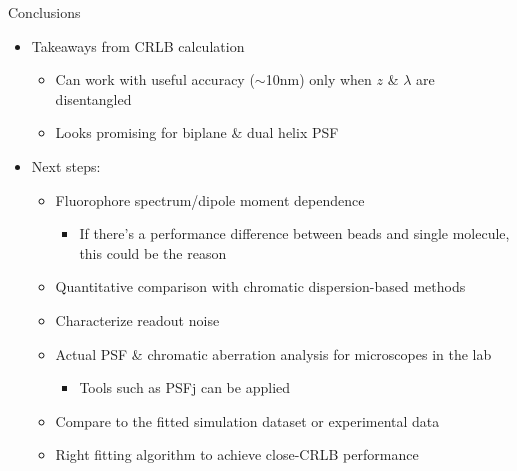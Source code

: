 \documentclass[t]{beamer}
\begin{document}
\begin{frame}{
    Conclusions
}
    \begin{itemize}
        \item Takeaways from CRLB calculation
    \begin{itemize}
        \item Can work with useful accuracy ($\sim$10nm) only when $z$ \& $\lambda$ are disentangled
        \item Looks promising for biplane \& dual helix PSF
    \end{itemize}
        \item Next steps:
    \begin{itemize}
        \item Fluorophore spectrum/dipole moment dependence 
    \begin{itemize}
        \item If there's a performance difference between beads and single molecule, this could be the reason 
    \end{itemize}
            \vspace{0.1em}
        \item Quantitative comparison with chromatic dispersion-based methods
            \vspace{0.1em}
        \item Characterize readout noise
            \vspace{0.1em}
        \item Actual PSF \& chromatic aberration analysis for microscopes in the lab 
        \begin{itemize}
            \item Tools such as PSFj can be applied
            \vspace{0.1em}
        \end{itemize}
        \item Compare to the fitted simulation dataset or experimental data
            \vspace{0.1em}
        \item Right fitting algorithm to achieve close-CRLB performance
    \end{itemize}
    \end{itemize}
\end{frame}

%    
\end{document}
